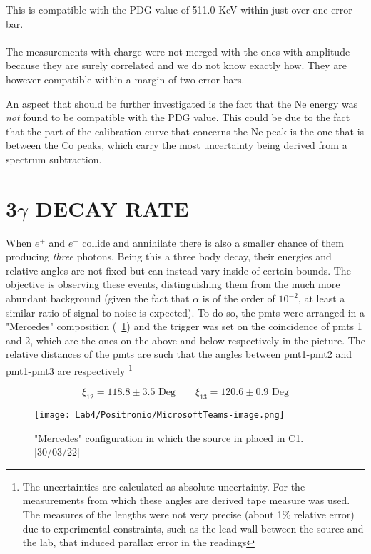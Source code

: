 \documentclass[10pt,a4paper,twocolumn]{article}
\begin{document}
\noindent This is compatible with the PDG value of 511.0 KeV within just over one error bar.
\\
\\
The measurements with charge were not merged with the ones with amplitude because they are surely correlated and we do not know exactly how. They are however compatible within a margin of two error bars.

An aspect that should be further investigated is the fact that the Ne energy was \textit{not} found to be compatible with the PDG value. This could be due to the fact that the part of the calibration curve that concerns the Ne peak is the one that is between the Co peaks, which carry the most uncertainty being derived from a spectrum subtraction.



\section{3$\gamma$ DECAY RATE}

When $e^+$ and $e^-$ collide and annihilate there is also a smaller chance of them producing \textit{three} photons. Being this a three body decay, their energies and relative angles are not fixed but can instead vary inside of certain bounds. The objective is observing these events, distinguishing them from the much more abundant background (given the fact that $\alpha$ is of the order of $10^{-2}$, at least a similar ratio of signal to noise is expected). To do so, the pmts were arranged in a "Mercedes" composition (\figurename~\ref{fig:mercedes}) and the trigger was set on the coincidence of pmts 1 and 2, which are the ones on the above and below respectively in the picture. The relative distances of the pmts are such that the angles between pmt1-pmt2 and pmt1-pmt3 are respectively \footnote{The uncertainties are calculated as absolute uncertainty. For the measurements from which these angles are derived tape measure was used. The measures of the lengths were not very precise (about 1\% relative error) due to experimental constraints, such as the lead wall between the source and the lab, that induced parallax error in the readings}

$$\xi_{12}= 118.8 \pm 3.5 \text{ Deg} \quad \quad \xi_{13}= 120.6 \pm 0.9 \text{ Deg} $$


 \begin{figure}[h!]
\centering
\texttt{[image: Lab4/Positronio/MicrosoftTeams-image.png]} 
\caption{"Mercedes" configuration in which the source in placed in C1.[30/03/22]}
\label{fig:mercedes}
\end{figure}
\end{document}
